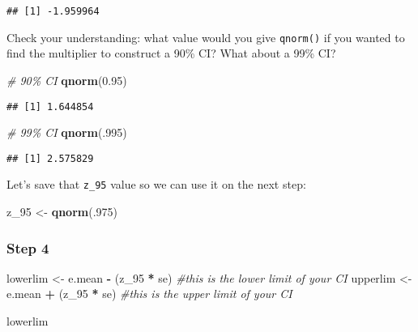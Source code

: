 \documentclass[
]{article}
\newenvironment{Shaded}{\begin{snugshade}}{\end{snugshade}}
\newcommand{\CommentTok}[1]{\textcolor[rgb]{0.56,0.35,0.01}{\textit{#1}}}
\newcommand{\DecValTok}[1]{\textcolor[rgb]{0.00,0.00,0.81}{#1}}
\newcommand{\FloatTok}[1]{\textcolor[rgb]{0.00,0.00,0.81}{#1}}
\newcommand{\FunctionTok}[1]{\textcolor[rgb]{0.13,0.29,0.53}{\textbf{#1}}}
\newcommand{\NormalTok}[1]{#1}
\newcommand{\OtherTok}[1]{\textcolor[rgb]{0.56,0.35,0.01}{#1}}
\newcommand{\SpecialCharTok}[1]{\textcolor[rgb]{0.81,0.36,0.00}{\textbf{#1}}}
\begin{document}
\begin{verbatim}
## [1] -1.959964
\end{verbatim}

Check your understanding: what value would you give \texttt{qnorm()} if
you wanted to find the multiplier to construct a 90\% CI? What about a
99\% CI?

\begin{Shaded}
\begin{Highlighting}[]
\CommentTok{\# 90\% CI}
\FunctionTok{qnorm}\NormalTok{(}\FloatTok{0.95}\NormalTok{)}
\end{Highlighting}
\end{Shaded}

\begin{verbatim}
## [1] 1.644854
\end{verbatim}

\begin{Shaded}
\begin{Highlighting}[]
\CommentTok{\# 99\% CI}
\FunctionTok{qnorm}\NormalTok{(.}\DecValTok{995}\NormalTok{)}
\end{Highlighting}
\end{Shaded}

\begin{verbatim}
## [1] 2.575829
\end{verbatim}

Let's save that \texttt{z\_95} value so we can use it on the next step:

\begin{Shaded}
\begin{Highlighting}[]
\NormalTok{z\_95 }\OtherTok{\textless{}{-}} \FunctionTok{qnorm}\NormalTok{(.}\DecValTok{975}\NormalTok{)}
\end{Highlighting}
\end{Shaded}

\hypertarget{step-4}{%
\subsubsection{Step 4}\label{step-4}}

\begin{Shaded}
\begin{Highlighting}[]
\NormalTok{lowerlim }\OtherTok{\textless{}{-}}\NormalTok{ e.mean }\SpecialCharTok{{-}}\NormalTok{ (z\_95 }\SpecialCharTok{*}\NormalTok{ se) }\CommentTok{\#this is the lower limit of your CI}
\NormalTok{upperlim }\OtherTok{\textless{}{-}}\NormalTok{ e.mean }\SpecialCharTok{+}\NormalTok{ (z\_95 }\SpecialCharTok{*}\NormalTok{ se) }\CommentTok{\#this is the upper limit of your CI}

\NormalTok{lowerlim}
\end{Highlighting}
\end{Shaded}
\end{document}
